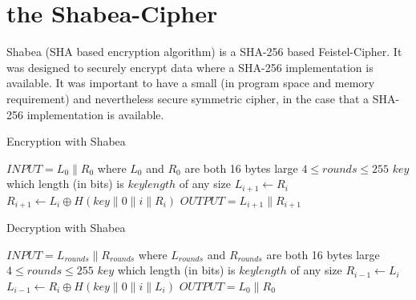 \section{the Shabea-Cipher}
Shabea (SHA based encryption algorithm) is a SHA-256 based Feistel-Cipher. It was designed to securely encrypt data where a SHA-256 implementation is available. It was important to have a small (in program space and memory requirement) and nevertheless secure symmetric cipher, in the case that a SHA-256 implementation is available.

\begin{algorithm}
\caption{Encryption with Shabea}
\label{algShabeaEnc}
\begin{algorithmic}
\REQUIRE $INPUT = L_0 \parallel R_0$ where $L_0$ and $R_0$ are both 16 bytes large
\REQUIRE $4\leq rounds\leq 255$
\REQUIRE $key$ which length (in bits) is $keylength$ of any size
\STATE $L_{i+1} \leftarrow R_i$
\STATE $R_{i+1} \leftarrow L_i \oplus H(key \parallel 0 \parallel i \parallel R_i)$
\ENDFOR
\STATE $OUTPUT = L_{i+1} \parallel R_{i+1}$
\end{algorithmic}
\end{algorithm}

\begin{algorithm}
\caption{Decryption with Shabea}
\label{algShabeaDec}
\begin{algorithmic}
\REQUIRE $INPUT = L_{rounds} \parallel R_{rounds}$ where $L_{rounds}$ and $R_{rounds}$ are both 16 bytes large
\REQUIRE $4\leq rounds\leq 255$
\REQUIRE $key$ which length (in bits) is $keylength$ of any size
\STATE $R_{i-1} \leftarrow L_i$
\STATE $L_{i-1} \leftarrow R_i \oplus H(key \parallel 0 \parallel i \parallel L_i)$
\ENDFOR
\STATE $OUTPUT = L_0 \parallel R_0$
\end{algorithmic}
\end{algorithm}
